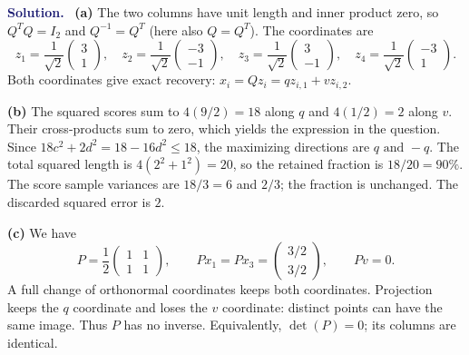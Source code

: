 \documentclass[11pt]{article}
\newenvironment{answer}{\par\medskip\noindent\textcolor{MidnightBlue}{\textbf{Solution.}}\ }{\par\medskip}
\begin{document}
\begin{answer}
\textbf{(a)} The two columns have unit length and inner product zero, so
$Q^TQ=I_2$ and $Q^{-1}=Q^T$ (here also $Q=Q^T$). The coordinates are
\[
 z_1=\frac1{\sqrt2}\begin{pmatrix}3\\1\end{pmatrix},\quad
 z_2=\frac1{\sqrt2}\begin{pmatrix}-3\\-1\end{pmatrix},\quad
 z_3=\frac1{\sqrt2}\begin{pmatrix}3\\-1\end{pmatrix},\quad
 z_4=\frac1{\sqrt2}\begin{pmatrix}-3\\1\end{pmatrix}.
\]
Both coordinates give exact recovery: $x_i=Qz_i=qz_{i,1}+vz_{i,2}$.

\textbf{(b)} The squared scores sum to $4(9/2)=18$ along $q$ and
$4(1/2)=2$ along $v$. Their cross-products sum to zero, which yields
the expression in the question. Since
$18c^2+2d^2=18-16d^2\leq18$, the maximizing directions are
$\boxed{q\text{ and }-q}$.
The total squared length is $4(2^2+1^2)=20$, so the retained fraction is
$\boxed{18/20=90\%}$. The score sample variances are $18/3=6$ and
$2/3$; the fraction is unchanged. The discarded squared error is $2$.

\textbf{(c)} We have
\[
 P=\frac12\begin{pmatrix}1&1\\1&1\end{pmatrix},\qquad
 Px_1=Px_3=\begin{pmatrix}3/2\\3/2\end{pmatrix},\qquad Pv=0.
\]
A full change of orthonormal coordinates keeps both coordinates.
Projection keeps the $q$ coordinate and loses the $v$ coordinate:
distinct points can have the same image. Thus $P$ has no inverse.
Equivalently, $\det(P)=0$; its columns are identical.
\end{answer}

\newpage
\end{document}
